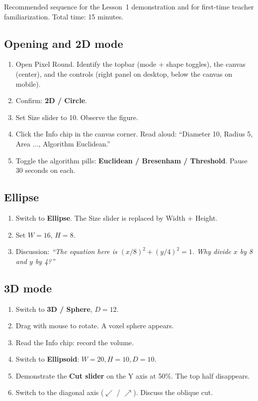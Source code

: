 \documentclass[12pt,letterpaper]{scrartcl}
\newcommand{\acc}[1]{\textcolor{accent}{\textbf{#1}}}
\begin{document}
Recommended sequence for the Lesson~1 demonstration and for first-time teacher familiarization. Total time: 15 minutes.

\subsection{Opening and 2D mode}
\begin{enumerate}[leftmargin=1.5em,itemsep=0.15em,topsep=0.3em]
  \item Open Pixel Round. Identify the topbar (mode + shape toggles), the canvas (center), and the controls (right panel on desktop, below the canvas on mobile).
  \item Confirm: \acc{2D / Circle}.
  \item Set Size slider to 10. Observe the figure.
  \item Click the Info chip in the canvas corner. Read aloud: ``Diameter 10, Radius 5, Area $\dots$, Algorithm Euclidean.''
  \item Toggle the algorithm pills: \acc{Euclidean / Bresenham / Threshold}. Pause 30 seconds on each.
\end{enumerate}

\subsection{Ellipse}
\begin{enumerate}[leftmargin=1.5em,itemsep=0.15em,topsep=0.3em]
  \item Switch to \acc{Ellipse}. The Size slider is replaced by Width + Height.
  \item Set $W = 16$, $H = 8$.
  \item Discussion: \emph{``The equation here is $(x/8)^2 + (y/4)^2 = 1$. Why divide $x$ by 8 and $y$ by 4?''}
\end{enumerate}

\subsection{3D mode}
\begin{enumerate}[leftmargin=1.5em,itemsep=0.15em,topsep=0.3em]
  \item Switch to \acc{3D / Sphere}, $D = 12$.
  \item Drag with mouse to rotate. A voxel sphere appears.
  \item Read the Info chip: record the volume.
  \item Switch to \acc{Ellipsoid}: $W = 20, H = 10, D = 10$.
  \item Demonstrate the \acc{Cut slider} on the Y axis at 50\%. The top half disappears.
  \item Switch to the diagonal axis ($\swarrow$ / $\nearrow$). Discuss the oblique cut.
\end{enumerate}
\end{document}
